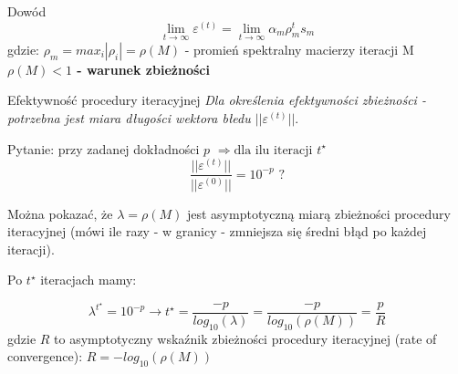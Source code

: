 \begin{frame}{Dowód}
    \[\lim_{t\to\infty} \varepsilon^{(t)} = \lim_{t\to\infty} \alpha _m \rho _m^t s_m\]
    gdzie: $\rho _m = max_i |\rho _i|= \rho(M)$ - promień spektralny macierzy iteracji M
    \center \textbf{$\rho(M) < 1$ - warunek zbieżności}
    \end{frame}
    \begin{frame}{Efektywność procedury iteracyjnej}
    \emph{Dla określenia efektywności zbieżności - potrzebna jest miara długości wektora błedu $||\varepsilon^{(t)}||$}.
    
    
    Pytanie: przy zadanej dokładności $p$ $\Rightarrow \text{dla ilu iteracji } 
    t^\star$\\
    
    $$\frac{||\varepsilon^{(t)}||}{||\varepsilon^{(0)}||} = 10^{-p}\text{ ?}$$    
    
    Można pokazać, że $\lambda=\rho(M)$ jest asymptotyczną miarą  zbieżności procedury iteracyjnej (mówi ile razy - w granicy - zmniejsza się średni błąd po każdej iteracji).
    
    Po $t^\star$ iteracjach mamy:
    
    $$\lambda^{t^\star}=10^{-p} \rightarrow t^\star =   \frac{-p}{log_{10}(\lambda)}=
    \frac{-p}{log_{10}(\rho(M))}=
     \frac{p}{R}
    $$
    gdzie $R$ to  asymptotyczny wskaźnik  zbieżności procedury iteracyjnej (rate of convergence): 
    $R=-log_{10}(\rho(M)) $
\end{frame}
